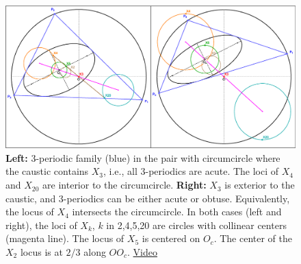 \begin{figure}
    \centering
    \includegraphics[width=\textwidth]{pics/0128_n3_circumcircle_pair.eps}
    \caption{\textbf{Left:} 3-periodic family (blue) in the pair with circumcircle where the caustic contains $X_3$, i.e., all 3-periodics are acute. The loci of $X_4$ and $X_{20}$ are interior to the circumcircle. \textbf{Right:} $X_3$ is exterior to the caustic, and 3-periodics can be either acute or obtuse. Equivalently, the locus of $X_4$ intersects the circumcircle. In both cases (left and right), the loci of $X_k$, $k$ in 2,4,5,20 are circles with collinear centers (magenta line). The locus of $X_5$ is centered on $O_c$. The center of the $X_2$ locus is at $2/3$ along $O O_c$. \href{https://youtu.be/HXgJQo2UT_8}{Video}}
    \label{fig:nonconcentric-circumcircle-circular-loci-right-tris}
\end{figure} 


